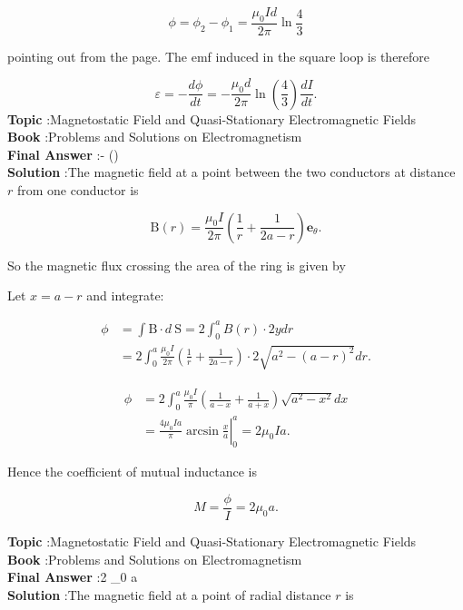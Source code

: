 \documentclass[10pt]{article}
\begin{document}
$$
\phi=\phi_{2}-\phi_{1}=\frac{\mu_{0} I d}{2 \pi} \ln \frac{4}{3}
$$

pointing out from the page. The emf induced in the square loop is therefore

$$
\varepsilon=-\frac{d \phi}{d t}=-\frac{\mu_{0} d}{2 \pi} \ln \left(\frac{4}{3}\right) \frac{d I}{d t} .
$$
\textbf{Topic} :Magnetostatic Field and Quasi-Stationary Electromagnetic Fields\\
\textbf{Book} :Problems and Solutions on Electromagnetism\\
\textbf{Final Answer} :- \ln \left(\right) \\


\textbf{Solution} :The magnetic field at a point between the two conductors at distance $r$ from one conductor is

$$
\mathrm{B}(r)=\frac{\mu_{0} I}{2 \pi}\left(\frac{1}{r}+\frac{1}{2 a-r}\right) \mathbf{e}_{\theta} .
$$

So the magnetic flux crossing the area of the ring is given by

Let $x=a-r$ and integrate:

$$
\begin{aligned}
\phi &=\int \mathrm{B} \cdot d \mathrm{~S}=2 \int_{0}^{a} B(r) \cdot 2 y d r \\
&=2 \int_{0}^{a} \frac{\mu_{0} I}{2 \pi}\left(\frac{1}{r}+\frac{1}{2 a-r}\right) \cdot 2 \sqrt{a^{2}-(a-r)^{2}} d r .
\end{aligned}
$$

$$
\begin{aligned}
\phi &=2 \int_{0}^{a} \frac{\mu_{0} I}{\pi}\left(\frac{1}{a-x}+\frac{1}{a+x}\right) \sqrt{a^{2}-x^{2}} d x \\
&=\left.\frac{4 \mu_{0} I a}{\pi} \arcsin \frac{x}{a}\right|_{0} ^{a}=2 \mu_{0} I a .
\end{aligned}
$$



Hence the coefficient of mutual inductance is

$$
M=\frac{\phi}{I}=2 \mu_{0} a .
$$

\textbf{Topic} :Magnetostatic Field and Quasi-Stationary Electromagnetic Fields\\
\textbf{Book} :Problems and Solutions on Electromagnetism\\
\textbf{Final Answer} :2 \mu_{0} a\\


\textbf{Solution} :The magnetic field at a point of radial distance $r$ is
\end{document}
